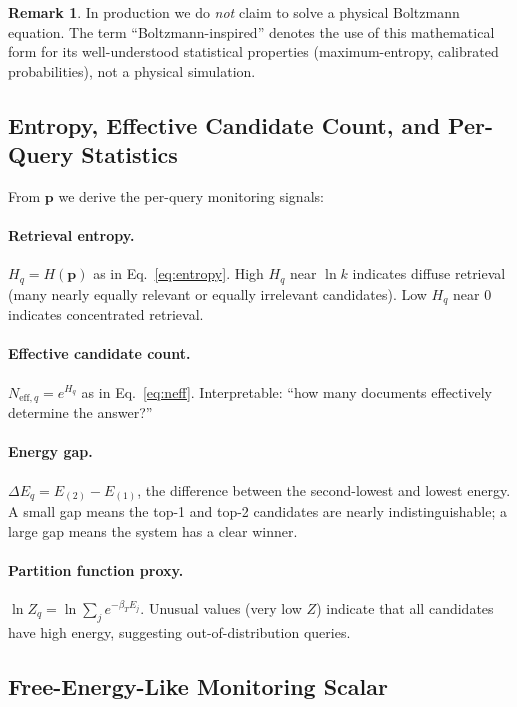 \documentclass[11pt,a4paper]{article}
\theoremstyle{definition}
\newtheorem{remark}{Remark}[section]
\begin{document}
\begin{remark}
  In production we do \emph{not} claim to solve a physical Boltzmann
  equation.
  The term ``Boltzmann-inspired'' denotes the use of this mathematical
  form for its well-understood statistical properties (maximum-entropy,
  calibrated probabilities), not a physical simulation.
\end{remark}

\subsection{Entropy, Effective Candidate Count, and Per-Query Statistics}

From $\mathbf{p}$ we derive the per-query monitoring signals:

\paragraph{Retrieval entropy.}
$H_q = H(\mathbf{p})$ as in Eq.~\eqref{eq:entropy}.
High $H_q$ near $\ln k$ indicates diffuse retrieval (many nearly
equally relevant or equally irrelevant candidates).
Low $H_q$ near $0$ indicates concentrated retrieval.

\paragraph{Effective candidate count.}
$N_{\text{eff},q} = e^{H_q}$ as in Eq.~\eqref{eq:neff}.
Interpretable: ``how many documents effectively determine the answer?''

\paragraph{Energy gap.}
$\Delta E_q = E_{(2)} - E_{(1)}$, the difference between the
second-lowest and lowest energy.
A small gap means the top-1 and top-2 candidates are nearly
indistinguishable; a large gap means the system has a clear winner.

\paragraph{Partition function proxy.}
$\ln Z_q = \ln \sum_j e^{-\beta_T E_j}$.
Unusual values (very low $Z$) indicate that all candidates have high
energy, suggesting out-of-distribution queries.

\subsection{Free-Energy-Like Monitoring Scalar}
\label{sec:fscalar}
\end{document}
